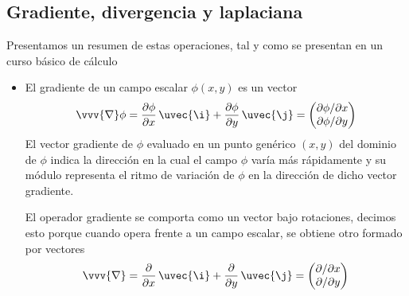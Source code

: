 \subsection{Gradiente, divergencia y laplaciana}
Presentamos un resumen de estas operaciones, tal y como se presentan en un curso básico
de cálculo
\begin{itemize}
\item El gradiente de un campo escalar $\phi(x,y)$ es un vector
\begin{equation}
  \vvv{\nabla}\phi
  = \dfrac{\partial \phi}{\partial x}\,\uvec{\i}
  + \dfrac{\partial \phi}{\partial y}\,\uvec{\j}
  = \begin{pmatrix}
    \partial \phi/\partial x\\
    \partial \phi/\partial y
    \end{pmatrix}
\end{equation}
El vector gradiente de $\phi$ evaluado en un punto genérico $(x,y)$ del dominio de $\phi$
indica la dirección en la cual el campo $\phi$ varía más rápidamente y su módulo
representa el ritmo de variación de $\phi$ en la dirección de dicho vector gradiente.

El operador gradiente se comporta como un vector bajo rotaciones, decimos esto porque
cuando opera frente a un campo escalar, se obtiene otro formado por vectores
\begin{equation}
  \vvv{\nabla}
  = \dfrac{\partial}{\partial x}\,\uvec{\i}
  + \dfrac{\partial}{\partial y}\,\uvec{\j}
  = \begin{pmatrix}
    \partial/\partial x\\
    \partial/\partial y
    \end{pmatrix}
\end{equation}


\end{itemize}
